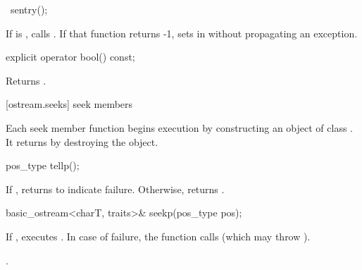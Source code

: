 %
\begin{itemdecl}
~sentry();
\end{itemdecl}

\begin{itemdescr}
\pnum
If
is
,
calls
. If that function returns -1, sets  in
 without propagating an exception.
\end{itemdescr}

%
%
\begin{itemdecl}
explicit operator bool() const;
\end{itemdecl}

\begin{itemdescr}
\pnum
\effects
Returns
.
\end{itemdescr}

[ostream.seeks]{ seek members}

\pnum
Each seek member function begins execution by constructing an object of class .
It returns by destroying the  object.

%
%
\begin{itemdecl}
pos_type tellp();
\end{itemdecl}

\begin{itemdescr}
\pnum
\returns
If
,
returns
to indicate failure.
Otherwise, returns
.
\end{itemdescr}

\begin{itemdecl}
basic_ostream<charT, traits>& seekp(pos_type pos);
\end{itemdecl}

\begin{itemdescr}
\pnum
\effects
If
,
executes
.
In case of failure, the function calls
(which may throw
).

\pnum
\returns
{}.
\end{itemdescr}

